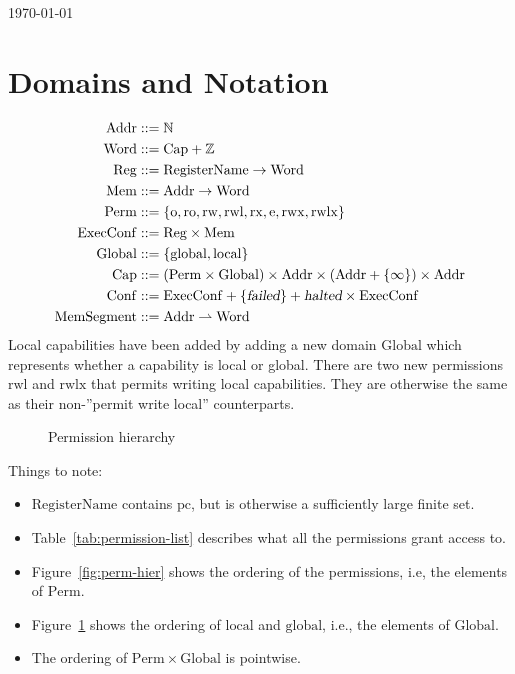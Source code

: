 \documentclass[a4paper]{article}
\newcommand{\parfun}{\rightharpoonup}
\newcommand{\pcreg}{\mathrm{pc}}
\newcommand{\failed}{\textsl{failed}}
\newcommand{\halted}{\textsl{halted}}
\newcommand{\plaindom}[1]{\mathrm{#1}}
\newcommand{\Caps}{\plaindom{Cap}}
\newcommand{\Words}{\plaindom{Word}}
\newcommand{\Addrs}{\plaindom{Addr}}
\newcommand{\ExecConfs}{\plaindom{ExecConf}}
\newcommand{\RegName}{\plaindom{RegisterName}}
\newcommand{\Regs}{\plaindom{Reg}}
\newcommand{\Heaps}{\plaindom{Mem}}
\newcommand{\HeapSegments}{\plaindom{MemSegment}}
\newcommand{\Confs}{\plaindom{Conf}}
\newcommand{\nats}{\mathbb{N}}
\newcommand{\ints}{\mathbb{Z}}
\newcommand{\Perms}{\plaindom{Perm}}
\newcommand{\Globals}{\plaindom{Global}}
\newcommand{\plainperm}[1]{\mathrm{#1}}
\newcommand{\noperm}{\plainperm{o}}
\newcommand{\readonly}{\plainperm{ro}}
\newcommand{\readwrite}{\plainperm{rw}}
\newcommand{\exec}{\plainperm{rx}}
\newcommand{\entry}{\plainperm{e}}
\newcommand{\rwx}{\plainperm{rwx}}
\newcommand{\readwritel}{\plainperm{rwl}}
\newcommand{\rwlx}{\plainperm{rwlx}}
\newcommand{\local}{\plainperm{local}}
\newcommand{\glob}{\plainperm{global}}
\begin{document}
\begin{flushright}
  \today
\end{flushright}
\section{Domains and Notation}

\begin{align*}
  \Addrs &::= \nats\\
  \Words &::= \Caps + \ints \\
  \Regs  &::= \RegName \rightarrow \Words\\
  \Heaps &::= \Addrs \rightarrow \Words \\
  \Perms &::= \{ \noperm, \readonly, \readwrite, \readwritel, \exec, \entry, \rwx, \rwlx\}\\
  \ExecConfs  &::= \Regs \times \Heaps \\
  \Globals & ::= \{\glob, \local \} \\
  \Caps  &::= (\Perms \times \Globals) \times \Addrs \times (\Addrs + \{ \infty \}) \times \Addrs\\
  \Confs &::= \ExecConfs + \{\failed \} + \halted \times \ExecConfs \\
  \HeapSegments &::= \Addrs \parfun \Words
\end{align*}
Local capabilities have been added by adding a new domain $\Globals$ which represents whether a capability is local or global. There are two new permissions $\readwritel$ and $\rwlx$ that permits writing local capabilities. They are otherwise the same as their non-''permit write local'' counterparts.

\begin{figure}[!h]
  \centering
  \caption{Permission hierarchy}
  \label{fig:glob-hier}
\end{figure}

Things to note:
\begin{itemize}
\item $\RegName$ contains $\pcreg$, but is otherwise a sufficiently
  large finite set.
\item Table~\ref{tab:permission-list} describes what all the permissions grant access to.
\item Figure~\ref{fig:perm-hier} shows the ordering of the permissions, i.e, the elements of $\Perms$.
\item Figure~\ref{fig:glob-hier} shows the ordering of $\local$ and $\glob$, i.e., the elements of $\Globals$.
\item The ordering of $\Perms \times \Globals$ is pointwise.
\end{itemize}
\end{document}
